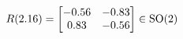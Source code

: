\documentclass[preview]{standalone}
\begin{document}
\begin{align*}
\special{dvisvgm:raw <g id='unique000'>}R(2.16) = \begin{bmatrix} -0.56 & -0.83 \\ 0.83 & -0.56 \end{bmatrix} \in \text{SO}(2)\special{dvisvgm:raw </g>}
\end{align*}
\end{document}
